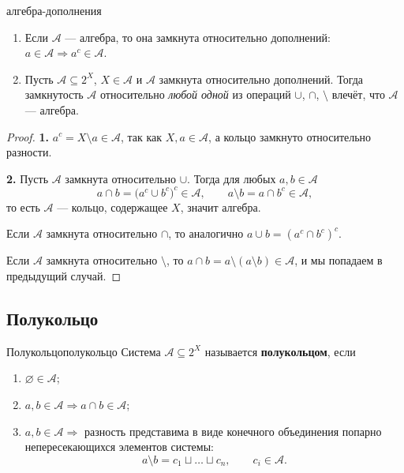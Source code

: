 \begin{Lemma}{}{алгебра-дополнения}
	\begin{enumerate}
		\item Если $\mathcal{A}$ --- алгебра, то она замкнута относительно
		дополнений: $a \in \mathcal{A} \Rightarrow a^{c} \in \mathcal{A}$.

		\item Пусть $\mathcal{A} \subseteq 2^X$, $X \in \mathcal{A}$ и
		$\mathcal{A}$ замкнута относительно дополнений. Тогда замкнутость
		$\mathcal{A}$ относительно \emph{любой одной} из операций
		$\cup$, $\cap$, $\setminus$ влечёт, что $\mathcal{A}$ --- алгебра.
	\end{enumerate}
\end{Lemma}

\begin{proof}
	\textbf{1.} $a^{c} = X \setminus a \in \mathcal{A}$, так как
	$X, a \in \mathcal{A}$, а кольцо замкнуто относительно разности.

	\medskip
	\textbf{2.} Пусть $\mathcal{A}$ замкнута относительно $\cup$. Тогда для
	любых $a,b \in \mathcal{A}$
	\[
	a \cap b = \bigl(a^{c} \cup b^{c}\bigr)^{c} \in \mathcal{A},
	\qquad
	a \setminus b = a \cap b^{c} \in \mathcal{A},
	\]
	то есть $\mathcal{A}$ --- кольцо, содержащее $X$, значит алгебра.

	Если $\mathcal{A}$ замкнута относительно $\cap$, то аналогично
	$a \cup b = (a^{c} \cap b^{c})^{c}$.

	Если $\mathcal{A}$ замкнута относительно $\setminus$, то
	$a \cap b = a \setminus (a \setminus b) \in \mathcal{A}$, и мы попадаем
	в предыдущий случай.
\end{proof}

\subsection{Полукольцо}

\begin{Definition}{Полукольцо}{полукольцо}
	Система $\mathcal{A} \subseteq 2^X$ называется \textbf{полукольцом}, если
	\begin{enumerate}
		\item $\varnothing \in \mathcal{A}$;
		\item $a,b \in \mathcal{A} \Rightarrow a \cap b \in \mathcal{A}$;
		\item $a,b \in \mathcal{A} \Rightarrow$ разность представима в виде
		конечного объединения попарно непересекающихся элементов системы:
		\[
		a \setminus b = c_1 \sqcup \ldots \sqcup c_n, \qquad
		c_i \in \mathcal{A}.
		\]
	\end{enumerate}
\end{Definition}

